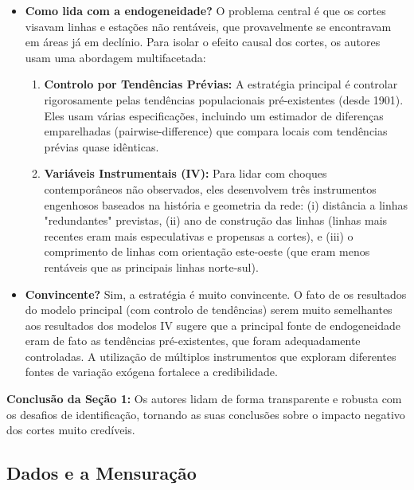 \documentclass[12pt, a4paper]{article}
\begin{document}
\begin{itemize}
    \item \textbf{Como lida com a endogeneidade?} O problema central é que os cortes visavam linhas e estações não rentáveis, que provavelmente se encontravam em áreas já em declínio. Para isolar o efeito causal dos cortes, os autores usam uma abordagem multifacetada:
        \begin{enumerate}
            \item \textbf{Controlo por Tendências Prévias:} A estratégia principal é controlar rigorosamente pelas tendências populacionais pré-existentes (desde 1901). Eles usam várias especificações, incluindo um estimador de diferenças emparelhadas (pairwise-difference) que compara locais com tendências prévias quase idênticas.
            \item \textbf{Variáveis Instrumentais (IV):} Para lidar com choques contemporâneos não observados, eles desenvolvem três instrumentos engenhosos baseados na história e geometria da rede: (i) distância a linhas "redundantes" previstas, (ii) ano de construção das linhas (linhas mais recentes eram mais especulativas e propensas a cortes), e (iii) o comprimento de linhas com orientação este-oeste (que eram menos rentáveis que as principais linhas norte-sul).
        \end{enumerate}

    \item \textbf{Convincente?} Sim, a estratégia é muito convincente. O fato de os resultados do modelo principal (com controlo de tendências) serem muito semelhantes aos resultados dos modelos IV sugere que a principal fonte de endogeneidade eram de fato as tendências pré-existentes, que foram adequadamente controladas. A utilização de múltiplos instrumentos que exploram diferentes fontes de variação exógena fortalece a credibilidade.
\end{itemize}

\noindent\textbf{Conclusão da Seção 1:} Os autores lidam de forma transparente e robusta com os desafios de identificação, tornando as suas conclusões sobre o impacto negativo dos cortes muito credíveis.

\subsection{Dados e a Mensuração}
\end{document}
